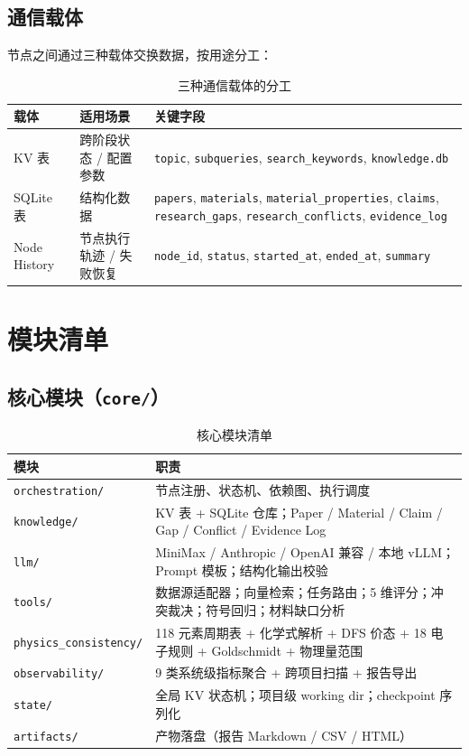 \documentclass[11pt,a4paper]{article}
\begin{document}
\subsection{通信载体}

节点之间通过三种载体交换数据，按用途分工：

\begin{table}[h]
\centering
\caption{三种通信载体的分工}
\begin{tabular}{@{}lp{4cm}p{6cm}@{}}
\toprule
\textbf{载体} & \textbf{适用场景} & \textbf{关键字段} \\
\midrule
KV 表 & 跨阶段状态 / 配置参数 & \texttt{topic}, \texttt{subqueries}, \texttt{search\_keywords}, \texttt{knowledge.db} \\
SQLite 表 & 结构化数据 & \texttt{papers}, \texttt{materials}, \texttt{material\_properties}, \texttt{claims}, \texttt{research\_gaps}, \texttt{research\_conflicts}, \texttt{evidence\_log} \\
Node History & 节点执行轨迹 / 失败恢复 & \texttt{node\_id}, \texttt{status}, \texttt{started\_at}, \texttt{ended\_at}, \texttt{summary} \\
\bottomrule
\end{tabular}
\end{table}

\section{模块清单}

\subsection{核心模块（\texttt{core/}）}

\begin{table}[h]
\centering
\small
\caption{核心模块清单}
\begin{tabular}{@{}lp{8cm}@{}}
\toprule
\textbf{模块} & \textbf{职责} \\
\midrule
\texttt{orchestration/} & 节点注册、状态机、依赖图、执行调度 \\
\texttt{knowledge/} & KV 表 + SQLite 仓库；Paper / Material / Claim / Gap / Conflict / Evidence Log \\
\texttt{llm/} & MiniMax / Anthropic / OpenAI 兼容 / 本地 vLLM；Prompt 模板；结构化输出校验 \\
\texttt{tools/} & 数据源适配器；向量检索；任务路由；5 维评分；冲突裁决；符号回归；材料缺口分析 \\
\texttt{physics\_consistency/} & 118 元素周期表 + 化学式解析 + DFS 价态 + 18 电子规则 + Goldschmidt + 物理量范围 \\
\texttt{observability/} & 9 类系统级指标聚合 + 跨项目扫描 + 报告导出 \\
\texttt{state/} & 全局 KV 状态机；项目级 working dir；checkpoint 序列化 \\
\texttt{artifacts/} & 产物落盘（报告 Markdown / CSV / HTML）\\
\bottomrule
\end{tabular}
\end{table}
\end{document}
